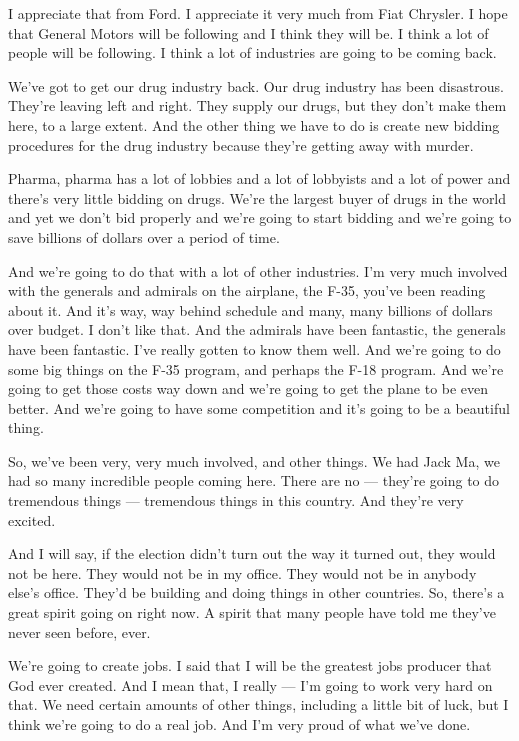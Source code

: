 I appreciate that from Ford. I appreciate it very much from Fiat
Chrysler. I hope that General Motors will be following and I think they
will be. I think a lot of people will be following. I think a lot of
industries are going to be coming back.

We've got to get our drug industry back. Our drug industry has been
disastrous. They're leaving left and right. They supply our drugs, but
they don't make them here, to a large extent. And the other thing we
have to do is create new bidding procedures for the drug industry
because they're getting away with murder.

Pharma, pharma has a lot of lobbies and a lot of lobbyists and a lot of
power and there's very little bidding on drugs. We're the largest buyer
of drugs in the world and yet we don't bid properly and we're going to
start bidding and we're going to save billions of dollars over a period
of time.

And we're going to do that with a lot of other industries. I'm very much
involved with the generals and admirals on the airplane, the F-35,
you've been reading about it. And it's way, way behind schedule and
many, many billions of dollars over budget. I don't like that. And the
admirals have been fantastic, the generals have been fantastic. I've
really gotten to know them well. And we're going to do some big things
on the F-35 program, and perhaps the F-18 program. And we're going to
get those costs way down and we're going to get the plane to be even
better. And we're going to have some competition and it's going to be a
beautiful thing.

So, we've been very, very much involved, and other things. We had Jack
Ma, we had so many incredible people coming here. There are no ---
they're going to do tremendous things --- tremendous things in this
country. And they're very excited.

And I will say, if the election didn't turn out the way it turned out,
they would not be here. They would not be in my office. They would not
be in anybody else's office. They'd be building and doing things in
other countries. So, there's a great spirit going on right now. A spirit
that many people have told me they've never seen before, ever.

We're going to create jobs. I said that I will be the greatest jobs
producer that God ever created. And I mean that, I really --- I'm going
to work very hard on that. We need certain amounts of other things,
including a little bit of luck, but I think we're going to do a real
job. And I'm very proud of what we've done.

